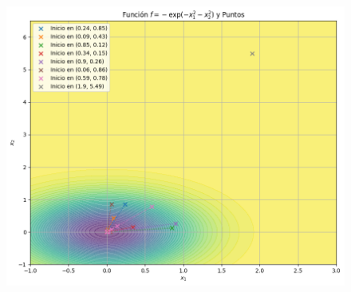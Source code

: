 \begin{itemize}
\begin{figure}
    \centering
    \includegraphics[width=0.65\linewidth]{figuras/PREG6_ARMIJO.png}
    \label{fig:enter-label}
\end{figure}

\end{itemize}




